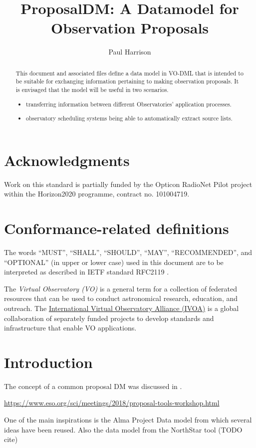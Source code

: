 \documentclass[11pt,a4paper]{ivoa}
\title{ProposalDM: A Datamodel for Observation Proposals}
\author[????URL????]{Paul Harrison}
\begin{document}
\begin{abstract}
This document and associated files define a data model in VO-DML that is intended to be suitable for exchanging
    information pertaining to making observation proposals. It is envisaged that the model will be useful in two scenarios.
\begin{itemize}
    \item transferring information between different Observatories' application processes.
    \item observatory scheduling systems being able to automatically extract source lists.
\end{itemize}
\end{abstract}


\section*{Acknowledgments}

Work on this standard is partially funded by the Opticon RadioNet Pilot project within the Horizon2020 programme, contract no. 101004719.

\section*{Conformance-related definitions}

The words ``MUST'', ``SHALL'', ``SHOULD'', ``MAY'', ``RECOMMENDED'', and
``OPTIONAL'' (in upper or lower case) used in this document are to be
interpreted as described in IETF standard RFC2119 \citep{std:RFC2119}.

The \emph{Virtual Observatory (VO)} is a
general term for a collection of federated resources that can be used
to conduct astronomical research, education, and outreach.
The \href{https://www.ivoa.net}{International
Virtual Observatory Alliance (IVOA)} is a global
collaboration of separately funded projects to develop standards and
infrastructure that enable VO applications.


\section{Introduction}


The concept of a common proposal DM was discussed in \cite{2008SPIE.7019E..0PB}.

\url{https://www.eso.org/sci/meetings/2018/proposal-tools-workshop.html}

One of the main inspirations is the Alma Project Data model
\cite{alma:projdm} from which several ideas have been reused. Also the data model from the NorthStar tool (TODO cite)
\end{document}
